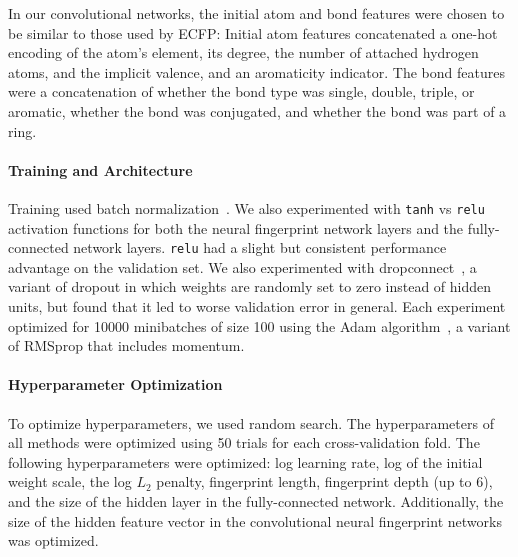 \documentclass{article}
\newcommand{\citep}{\cite}
\begin{document}
In our convolutional networks, the initial atom and bond features were chosen to be similar to those used by ECFP:
Initial atom features concatenated a one-hot encoding of the atom's element, its degree, the number of attached hydrogen atoms, and the implicit valence, and an aromaticity indicator.
The bond features were a concatenation of whether the bond type was single, double, triple, or aromatic, whether the bond was conjugated, and whether the bond was part of a ring.

\paragraph{Training and Architecture}
Training used batch normalization~\citep{ioffe2015batch}.
We also experimented with \texttt{tanh} vs \texttt{relu} activation functions for both the neural fingerprint network layers and the fully-connected network layers.
\texttt{relu} had a slight but consistent performance advantage on the validation set.
We also experimented with dropconnect~\citep{wan2013regularization}, a variant of dropout in which weights are randomly set to zero instead of hidden units, but found that it led to worse validation error in general.
Each experiment optimized for 10000 minibatches of size 100 using the Adam algorithm~\citep{Adam14}, a variant of RMSprop that includes momentum.

\paragraph{Hyperparameter Optimization}
To optimize hyperparameters, we used random search.
The hyperparameters of all methods were optimized using 50 trials for each cross-validation fold.
The following hyperparameters were optimized: log learning rate, log of the initial weight scale, the log $L_2$ penalty, fingerprint length, fingerprint depth (up to 6), and the size of the hidden layer in the fully-connected network.
Additionally, the size of the hidden feature vector in the convolutional neural fingerprint networks was optimized.
\end{document}
